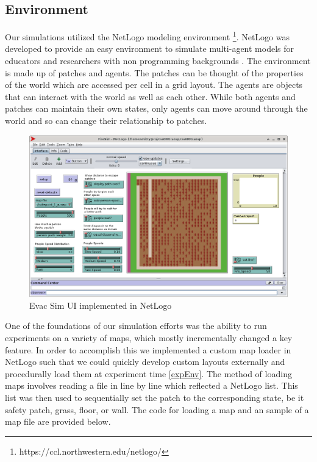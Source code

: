 \documentclass[12pt,letterpaper]{article}
\begin{document}
\subsection{Environment}

Our simulations utilized the NetLogo modeling environment \footnote{https://ccl.northwestern.edu/netlogo/}.  NetLogo was developed to provide an easy environment to simulate multi-agent models for educators and researchers with non programming backgrounds \cite{netlogo}.  The environment is made up of patches and agents.  The patches can be thought of the properties of the world which are accessed per cell in a grid layout.  The agents are objects that can interact with the world as well as each other.  While both agents and patches can maintain their own states, only agents can move around through the world and so can change their relationship to patches.


\begin{figure}[!h]
  \centering
  \includegraphics[width=\linewidth]{./figures/fire_sim_ui.png}
  \caption{Evac Sim UI implemented in NetLogo}
\end{figure}

One of the foundations of our simulation efforts was the ability to run experiments on a variety of maps, which mostly incrementally changed a key feature.  In order to accomplish this we implemented a custom map loader in NetLogo such that we could quickly develop custom layouts externally and procedurally load them at experiment time \ref{expEnv}.  The method of loading maps involves reading a file in line by  line which reflected a NetLogo list.  This list was then used to sequentially set the patch to the corresponding state, be it safety patch, grass, floor, or wall.  The code for loading a map and an sample of a map file are provided below.
\end{document}

